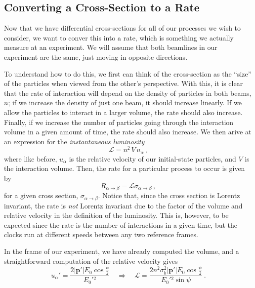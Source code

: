 \documentclass{article}
\numberwithin{equation}{subsection}
\begin{document}
\subsection{Converting a Cross-Section to a Rate}

Now that we have differential cross-sections for all of our processes we wish to consider, we want to conver this into a rate, which is something we actually
measure at an experiment. We will assume that both beamlines in our experiment are the same, just moving in opposite directions.

To understand how to do this, we first can think of the cross-section as the ``size'' of the particles when viewed from the other's perspective. With this, it is
clear that the rate of interaction will depend on the density of particles in both beams, $n$; if we increase the density of just one beam, it should increase linearly. If
we allow the particles to interact in a larger volume, the rate should also increase. Finally, if we increase the number of particles going through the interaction
volume in a given amount of time, the rate should also increase. We then arive at an expression for the \textit{instantaneous luminosity}
\begin{equation}
	\mathcal{L} = n^2\,V\,u_\alpha \,,
\end{equation}
where like before, $u_\alpha$ is the relative velocity of our initial-state particles, and $V$ is the interaction volume. Then, the rate for a particular process to occur
is given by
\begin{equation}
	R_{\alpha\to\beta} = \mathcal{L}\sigma_{\alpha\to\beta}\,,
\end{equation}
for a given cross section, $\sigma_{\alpha\to\beta}$. Notice that, since the cross section is Lorentz invariant, the rate is \textit{not} Lorentz invariant due to the factor
of the volume and relative velocity in the definition of the luminosity. This is, however, to be expected since the rate is the number of interactions in a given time,
but the clocks run at different speeds between any two reference frames.

In the frame of our experiment, we have already computed the volume, and a straightforward computation of the relative velocity gives
\begin{equation}
	u_\alpha' = \frac{2|\mathbf{p}'|E_0\cos\frac{\psi}{2}}{E_0'{}^2} \quad \Rightarrow \quad 
	\mathcal{L} = \frac{2 n^2 \sigma_b^2|\mathbf{p}'|E_0\cos\frac{\psi}{2}}{E_0'{}^2\sin\psi}\,.
\end{equation}
\end{document}
